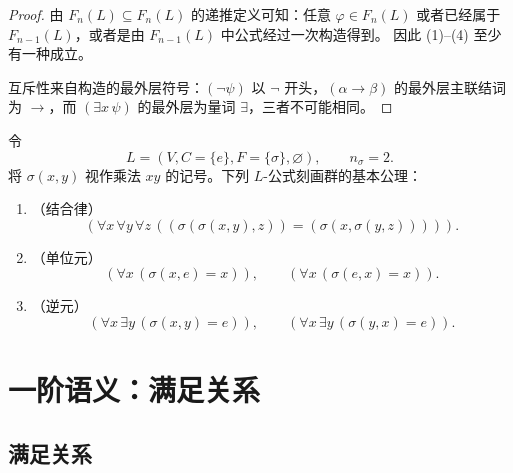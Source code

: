 \documentclass[lang=cn,a4paper,newtx,section]{elegantbook}
\begin{document}
 \begin{proof}
 由 $F_n(L)\subseteq F_{n}(L)$ 的递推定义可知：任意 $\varphi\in F_n(L)$ 或者已经属于 $F_{n-1}(L)$，或者是由 $F_{n-1}(L)$ 中公式经过一次构造得到。
 因此 (1)--(4) 至少有一种成立。
 
 互斥性来自构造的最外层符号：$(\neg\psi)$ 以 $\neg$ 开头，$(\alpha\to\beta)$ 的最外层主联结词为 $\to$，而 $(\exists x\,\psi)$ 的最外层为量词 $\exists$，三者不可能相同。
 \end{proof}
 
 \begin{example}[群语言中的公理公式]
 令
 \[
   L=(V,C=\{e\},F=\{\sigma\},\varnothing),\qquad n_{\sigma}=2.
 \]
 将 $\sigma(x,y)$ 视作乘法 $xy$ 的记号。下列 $L$-公式刻画群的基本公理：
 \begin{enumerate}
   \item （结合律）
   \[
     (\forall x\,\forall y\,\forall z\,((\sigma(\sigma(x,y),z))=(\sigma(x,\sigma(y,z))))) .
   \]
   \item （单位元）
   \[
     (\forall x\,(\sigma(x,e)=x)),\qquad (\forall x\,(\sigma(e,x)=x)).
   \]
   \item （逆元）
   \[
     (\forall x\,\exists y\,(\sigma(x,y)=e)),\qquad (\forall x\,\exists y\,(\sigma(y,x)=e)).
   \]
 \end{enumerate}
 \end{example}

\chapter{一阶语义：满足关系}

 \section{满足关系}
\end{document}
